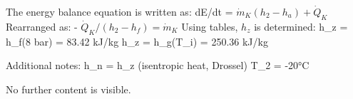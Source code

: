 The energy balance equation is written as:  
dE/dt = \( \dot{m}_K (h_2 - h_a) + \dot{Q}_K \)  
Rearranged as:  
- \( \dot{Q}_K / (h_2 - h_f) = \dot{m}_K \)  
Using tables, \( h_z \) is determined:  
h_z = h_f(8 bar) = 83.42 kJ/kg  
h_z = h_g(T_i) = 250.36 kJ/kg  

Additional notes:  
h_n = h_z (isentropic heat, Drossel)  
T_2 = -20°C  

No further content is visible.